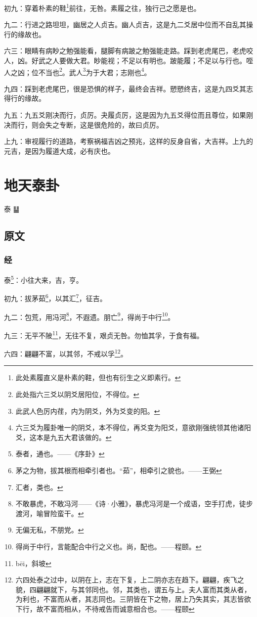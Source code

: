 \documentclass[12pt,oneside]{book}
\begin{document}
初九：穿着朴素的鞋\footnote{此处素履直义是朴素的鞋，但也有衍生之义即素行。}前往，无咎。素履之往，独行己之愿是也。

九二：行进之路坦坦，幽居之人贞吉。幽人贞吉，这是九二爻居中位而不自乱其操行的缘故也。

六三：眼睛有病眇之勉强能看，腿脚有病跛之勉强能走路。踩到老虎尾巴，老虎咬人，凶。好武之人要做大君。眇能视；不足以有明也。跛能履；不足以与行也。咥人之凶；位不当也\footnote{此处指六三爻以阴爻居阳位，不得位。}。武人\footnote{此武人色厉内荏，内为阴爻，外为爻变的阳。}为于大君；志刚也\footnote{六三爻为履卦唯一的阴爻，本不得位，再爻变为阳爻，意欲刚强统领其他诸阳爻，这本是九五大君该做的。}。

九四：踩到老虎尾巴，很是恐惧的样子，最终会吉祥。愬愬终吉，这是九四爻其志得行的缘故。

九五：九五爻刚决而行，贞厉。夬履贞厉，这是因为九五爻得位而且尊位，如果刚决而行，则会失之专断，这是很危险的，故曰贞厉。

上九：审视履行的道路，考察祸福吉凶之预兆，这样的反身自省，大吉祥。上九的元吉，是因为履道大成，必有庆也。



\chapter{地天泰卦}
泰 {\Large ䷊}

\section{原文}

\subsection{经}
泰\footnote{泰者，通也。——《序卦》}：小往大来，吉，亨。

初九：拔茅茹\footnote{茅之为物，拔其根而相牵引者也。“茹”，相牵引之貌也。——王弼}，以其汇\footnote{汇者，类也。}，征吉。

九二：包荒，用冯河\footnote{不敢暴虎，不敢冯河——《诗·小雅》，暴虎冯河是一个成语，空手打虎，徒步渡河，喻冒险蛮干。}，不遐遗。朋亡\footnote{无偏无私，不朋党。}，得尚于中行\footnote{得尚于中行，言能配合中行之义也。尚，配也。——程颐。}。

九三：无平不陂\footnote{bēi，斜坡}，无往不复，艰贞无咎。勿恤其孚，于食有福。

六四：翩翩不富，以其邻，不戒以孚\footnote{六四处泰之过中，以阴在上，志在下复，上二阴亦志在趋下。翩翩，疾飞之貌，四翩翩就下，与其邻同也。邻，其类也，谓五与上。夫人富而其类从者，为利也，不富而从者，其志同也。三阴皆在下之物，居上乃失其实，其志皆欲下行，故不富而相从，不待戒告而诚意相合也。——程颐}。
\end{document}
